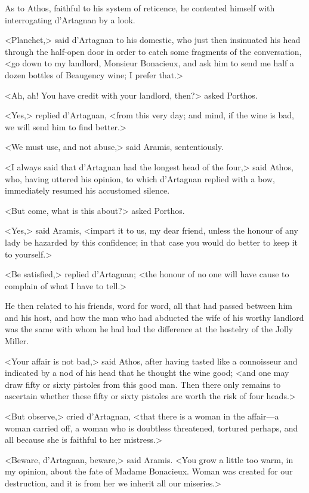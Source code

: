 As to Athos, faithful to his system of reticence, he contented himself with interrogating d'Artagnan by a look. 

<Planchet,> said d'Artagnan to his domestic, who just then insinuated his head through the half-open door in order to catch some fragments of the conversation, <go down to my landlord, Monsieur Bonacieux, and ask him to send me half a dozen bottles of Beaugency wine; I prefer that.> 

<Ah, ah! You have credit with your landlord, then?> asked Porthos. 

<Yes,> replied d'Artagnan, <from this very day; and mind, if the wine is bad, we will send him to find better.> 

<We must use, and not abuse,> said Aramis, sententiously. 

<I always said that d'Artagnan had the longest head of the four,> said Athos, who, having uttered his opinion, to which d'Artagnan replied with a bow, immediately resumed his accustomed silence. 

<But come, what is this about?> asked Porthos. 

<Yes,> said Aramis, <impart it to us, my dear friend, unless the honour of any lady be hazarded by this confidence; in that case you would do better to keep it to yourself.> 

<Be satisfied,> replied d'Artagnan; <the honour of no one will have cause to complain of what I have to tell.> 

He then related to his friends, word for word, all that had passed between him and his host, and how the man who had abducted the wife of his worthy landlord was the same with whom he had had the difference at the hostelry of the Jolly Miller. 

<Your affair is not bad,> said Athos, after having tasted like a connoisseur and indicated by a nod of his head that he thought the wine good; <and one may draw fifty or sixty pistoles from this good man. Then there only remains to ascertain whether these fifty or sixty pistoles are worth the risk of four heads.> 

<But observe,> cried d'Artagnan, <that there is a woman in the affair---a woman carried off, a woman who is doubtless threatened, tortured perhaps, and all because she is faithful to her mistress.> 

<Beware, d'Artagnan, beware,> said Aramis. <You grow a little too warm, in my opinion, about the fate of Madame Bonacieux. Woman was created for our destruction, and it is from her we inherit all our miseries.> 

